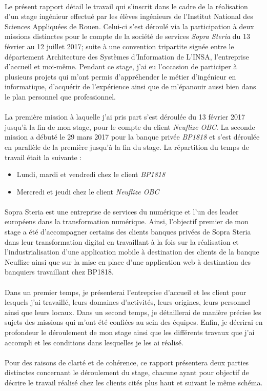 \paragraph{}
Le présent rapport détail le travail qui s’inscrit dans le cadre de la réalisation d’un stage ingénieur effectué par les élèves ingénieurs de l’Institut National des Sciences Appliquées de Rouen. Celui-ci s’est déroulé via la participation à deux missions distinctes pour le compte de la société de services \textit{Sopra Steria} du 13 février au 12 juillet 2017; suite à une convention tripartite signée entre le département Architecture des Systèmes d’Information de L’INSA, l’entreprise d’accueil et moi-même. Pendant ce stage, j’ai eu l’occasion de participer à plusieurs projets qui m’ont permis d’appréhender le métier d’ingénieur en informatique, d’acquérir de l’expérience ainsi que de m’épanouir aussi bien dans le plan personnel que professionnel.

\paragraph{}
La première mission à laquelle j'ai pris part s'est déroulée du 13 février 2017 jusqu'à la fin de mon stage, pour le compte du client \textit{Neuflize OBC}. La seconde mission a débuté le 29 mars 2017 pour la banque privée \textit{BP1818} et s'est déroulée en parallèle de la première jusqu'à la fin du stage. La répartition du temps de travail était la suivante :
\begin{itemize}
	\item Lundi, mardi et vendredi chez le client \textit{BP1818}
	\item Mercredi et jeudi chez le client \textit{Neuflize OBC}
\end{itemize}

\paragraph{}
Sopra Steria est une entreprise de services du numérique et l'un des leader européens dans la transformation numérique. Ainsi, l'objectif premier de mon stage a été d'accompagner certains des clients banques privées de Sopra Steria dans leur transformation digital en travaillant à la fois sur la réalisation et l'industrialisation d'une application mobile à destination des clients de la banque Neuflize ainsi que sur la mise en place d'une application web à destination des banquiers travaillant chez BP1818.

\paragraph{}
Dans un premier temps, je présenterai l'entreprise d'accueil et les client pour lesquels j'ai travaillé, leurs domaines d’activités, leurs origines, leurs personnel ainsi que leurs locaux.
Dans un second temps, je détaillerai de manière précise les sujets des missions qui m’ont été confiées au sein des équipes.
Enfin, je décrirai en profondeur le déroulement de mon stage ainsi que les différents travaux que j’ai accompli et les conditions dans lesquelles je les ai réalisé. 

\paragraph{}
Pour des raisons de clarté et de cohérence, ce rapport présentera deux parties distinctes concernant le déroulement du stage, chacune ayant pour objectif de décrire le travail réalisé chez les clients cités plus haut et suivant le même schéma.